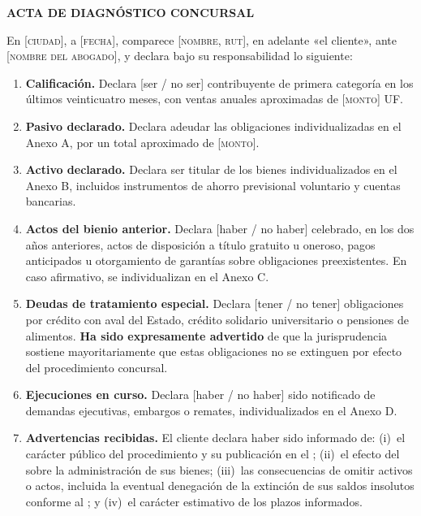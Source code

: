 \begin{escrito}
\small
\noindent\textbf{ACTA DE DIAGNÓSTICO CONCURSAL}

\medskip
\noindent En [\textsc{ciudad}], a [\textsc{fecha}], comparece [\textsc{nombre},
\textsc{rut}], en adelante «el cliente», ante [\textsc{nombre del abogado}], y declara
bajo su responsabilidad lo siguiente:

\begin{enumerate}[leftmargin=1.6em]
  \item \textbf{Calificación.} Declara [ser / no ser] contribuyente de primera categoría
  en los últimos veinticuatro meses, con ventas anuales aproximadas de
  [\textsc{monto}] UF.

  \item \textbf{Pasivo declarado.} Declara adeudar las obligaciones individualizadas en
  el Anexo A, por un total aproximado de [\textsc{monto}].

  \item \textbf{Activo declarado.} Declara ser titular de los bienes individualizados en
  el Anexo B, incluidos instrumentos de ahorro previsional voluntario y cuentas
  bancarias.

  \item \textbf{Actos del bienio anterior.} Declara [haber / no haber] celebrado, en los
  dos años anteriores, actos de disposición a título gratuito u oneroso, pagos
  anticipados u otorgamiento de garantías sobre obligaciones preexistentes. En caso
  afirmativo, se individualizan en el Anexo C.

  \item \textbf{Deudas de tratamiento especial.} Declara [tener / no tener] obligaciones
  por crédito con aval del Estado, crédito solidario universitario o pensiones de
  alimentos. \textbf{Ha sido expresamente advertido} de que la jurisprudencia sostiene
  mayoritariamente que estas obligaciones no se extinguen por efecto del procedimiento
  concursal.

  \item \textbf{Ejecuciones en curso.} Declara [haber / no haber] sido notificado de
  demandas ejecutivas, embargos o remates, individualizados en el Anexo D.

  \item \textbf{Advertencias recibidas.} El cliente declara haber sido informado de:
  (i)~el carácter público del procedimiento y su publicación en el \boletin{};
  (ii)~el efecto del \desasimiento{} sobre la administración de sus bienes;
  (iii)~las consecuencias de omitir activos o actos, incluida la eventual denegación de
  la extinción de sus saldos insolutos conforme al ; y (iv)~el carácter
  estimativo de los plazos informados.
\end{enumerate}


\end{escrito}
